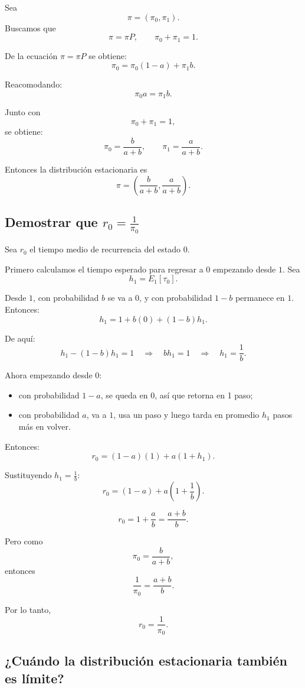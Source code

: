 \documentclass[12pt]{article}
\begin{document}
Sea
\[
\pi=(\pi_0,\pi_1).
\]
Buscamos que
\[
\pi=\pi P,
\qquad
\pi_0+\pi_1=1.
\]

De la ecuación \(\pi=\pi P\) se obtiene:
\[
\pi_0=\pi_0(1-a)+\pi_1 b.
\]

Reacomodando:
\[
\pi_0 a=\pi_1 b.
\]

Junto con
\[
\pi_0+\pi_1=1,
\]
se obtiene:
\[
\pi_0=\frac{b}{a+b},
\qquad
\pi_1=\frac{a}{a+b}.
\]

Entonces la distribución estacionaria es
\[
\boxed{\pi=\left(\frac{b}{a+b},\frac{a}{a+b}\right)}.
\]

\subsection*{Demostrar que \(r_0=\frac{1}{\pi_0}\)}

Sea \(r_0\) el tiempo medio de recurrencia del estado \(0\).

Primero calculamos el tiempo esperado para regresar a \(0\) empezando desde \(1\). Sea
\[
h_1=E_1[\tau_0].
\]

Desde \(1\), con probabilidad \(b\) se va a \(0\), y con probabilidad \(1-b\) permanece en \(1\). Entonces:
\[
h_1=1+b(0)+(1-b)h_1.
\]

De aquí:
\[
h_1-(1-b)h_1=1
\quad\Longrightarrow\quad
bh_1=1
\quad\Longrightarrow\quad
h_1=\frac1b.
\]

Ahora empezando desde \(0\):

\begin{itemize}
    \item con probabilidad \(1-a\), se queda en \(0\), así que retorna en 1 paso;
    \item con probabilidad \(a\), va a \(1\), usa un paso y luego tarda en promedio \(h_1\) pasos más en volver.
\end{itemize}

Entonces:
\[
r_0=(1-a)(1)+a(1+h_1).
\]

Sustituyendo \(h_1=\frac1b\):
\[
r_0=(1-a)+a\left(1+\frac1b\right).
\]

\[
r_0=1+\frac{a}{b}
=\frac{a+b}{b}.
\]

Pero como
\[
\pi_0=\frac{b}{a+b},
\]
entonces
\[
\frac1{\pi_0}=\frac{a+b}{b}.
\]

Por lo tanto,
\[
\boxed{r_0=\frac1{\pi_0}}.
\]

\subsection*{¿Cuándo la distribución estacionaria también es límite?}
\end{document}
